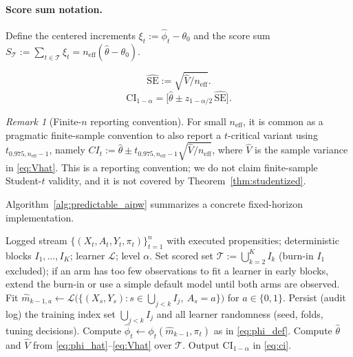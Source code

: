 \documentclass[11pt]{article}
\numberwithin{equation}{section}
\theoremstyle{plain}
\theoremstyle{definition}
\theoremstyle{remark}
\newtheorem{remark}[theorem]{Remark}
\begin{document}
\paragraph{Score sum notation.}
Define the centered increments $\xi_t:=\widehat\phi_t-\theta_0$ and the score sum
$S_{\mathcal{T}}:=\sum_{t\in\mathcal{T}}\xi_t=n_{\mathrm{eff}}(\widehat\theta-\theta_0)$.

\begin{equation}\label{eq:sehat}
\widehat{\mathrm{SE}} := \sqrt{\widehat V/n_{\mathrm{eff}}}.
\end{equation}
\begin{equation}\label{eq:ci}
\mathrm{CI}_{1-\alpha} = \Big[\widehat{\theta}\pm z_{1-\alpha/2}\,\widehat{\mathrm{SE}}\Big].
\end{equation}
\begin{remark}[Finite-$n$ reporting convention]\label{rem:t_vs_z}
For small $n_{\mathrm{eff}}$, it is common as a pragmatic finite-sample convention to also report a $t$-critical variant using $t_{0.975, n_{\mathrm{eff}}-1}$, namely $CI_t:=\widehat\theta\pm t_{0.975, n_{\mathrm{eff}}-1}\sqrt{\widehat V/n_{\mathrm{eff}}}$, where $\widehat V$ is the sample variance in \eqref{eq:Vhat}. This is a reporting convention; we do not claim finite-sample Student-$t$ validity, and it is not covered by Theorem~\ref{thm:studentized}.
\end{remark}

Algorithm~\ref{alg:predictable_aipw} summarizes a concrete fixed-horizon implementation.

\begin{algorithm}[!htbp]
\caption{Auditable predictable AIPW/DML at a prespecified horizon}\label{alg:predictable_aipw}
\begin{algorithmic}[1]
\Require Logged stream $\{(X_t,A_t,Y_t,\pi_t)\}_{t=1}^n$ with executed propensities; deterministic blocks $I_1,\dots,I_K$; learner $\mathcal{L}$; level $\alpha$.
\State Set scored set $\mathcal{T}:=\bigcup_{k=2}^K I_k$ (burn-in $I_1$ excluded); if an arm has too few observations to fit a learner in early blocks, extend the burn-in or use a simple default model until both arms are observed.
\State Fit $\widehat m_{k-1,a}\leftarrow \mathcal{L}\big(\{(X_s,Y_s): s\in\bigcup_{j<k} I_j,\ A_s=a\}\big)$ for $a\in\{0,1\}$.
\State Persist (audit log) the training index set $\bigcup_{j<k} I_j$ and all learner randomness (seed, folds, tuning decisions).
\State Compute $\widehat\phi_t \leftarrow \phi_t(\widehat m_{k-1},\pi_t)$ as in \eqref{eq:phi_def}.
\EndFor
\EndFor
\State Compute $\widehat\theta$ and $\widehat V$ from \eqref{eq:phi_hat}--\eqref{eq:Vhat} over $\mathcal{T}$.
\State Output $\mathrm{CI}_{1-\alpha}$ in \eqref{eq:ci}.
\end{algorithmic}
\end{algorithm}
\end{document}
